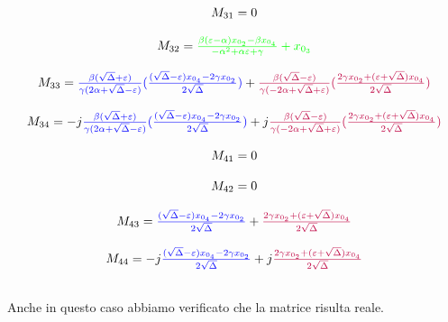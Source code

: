 \begin{small}
\begin{displaymath}
\begin{array}{c}
M_{31}=0 \\ \\
M_{32}=\textcolor{green}{\frac{\beta(\varepsilon-\alpha)x_{0_{2}}-\beta x_{0_{4}}}{-\alpha^{2}+\alpha\varepsilon+\gamma}+x_{0_{3}}} \\ \\
M_{33}={\color{blue}\frac{\beta(\sqrt{\Delta}+\varepsilon)}{\gamma(2\alpha+\sqrt{\Delta}-\varepsilon)}(\frac{(\sqrt{\Delta}-\varepsilon)x_{0_{4}}-2\gamma x_{0_{2}}}{2\sqrt{\Delta}})}+\textcolor{purple}{\frac{\beta(\sqrt{\Delta}-\varepsilon)}{\gamma(-2\alpha+\sqrt{\Delta}+\varepsilon)}(\frac{2\gamma x_{0_{2}}+(\varepsilon+\sqrt{\Delta})x_{0_{4}}}{2\sqrt{\Delta}})} \\ \\
M_{34}=-j{\color{blue}\frac{\beta(\sqrt{\Delta}+\varepsilon)}{\gamma(2\alpha+\sqrt{\Delta}-\varepsilon)}(\frac{(\sqrt{\Delta}-\varepsilon)x_{0_{4}}-2\gamma x_{0_{2}}}{2\sqrt{\Delta}})}+j\textcolor{purple}{\frac{\beta(\sqrt{\Delta}-\varepsilon)}{\gamma(-2\alpha+\sqrt{\Delta}+\varepsilon)}(\frac{2\gamma x_{0_{2}}+(\varepsilon+\sqrt{\Delta})x_{0_{4}}}{2\sqrt{\Delta}})} \\ \\
M_{41}=0 \\ \\
M_{42}=0 \\ \\
M_{43}={\color{blue}\frac{(\sqrt{\Delta}-\varepsilon)x_{0_{4}}-2\gamma x_{0_{2}}}{2\sqrt{\Delta}}}+{\color{purple}\frac{2\gamma x_{0_{2}}+(\varepsilon+\sqrt{\Delta})x_{0_{4}}}{2\sqrt{\Delta}}} \\ \\
M_{44}=-j{\color{blue}\frac{(\sqrt{\Delta}-\varepsilon)x_{0_{4}}-2\gamma x_{0_{2}}}{2\sqrt{\Delta}}}+j{\color{purple}\frac{2\gamma x_{0_{2}}+(\varepsilon+\sqrt{\Delta})x_{0_{4}}}{2\sqrt{\Delta}}}\\ \\
\end{array}
\end{displaymath}
\end{small}
Anche in questo caso abbiamo verificato che la matrice risulta reale.